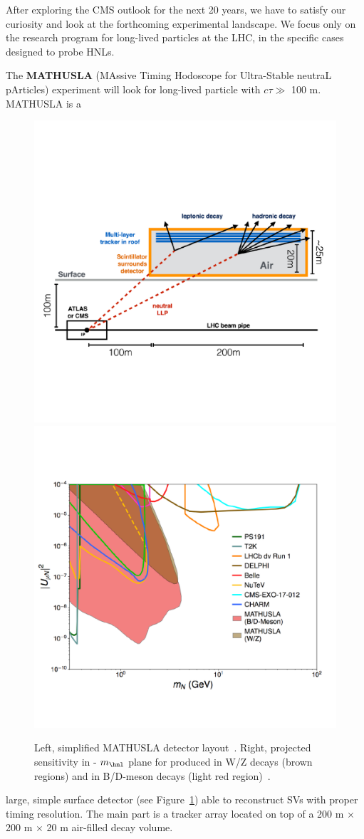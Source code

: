 After exploring the CMS outlook for the next 20 years, we have to satisfy
our curiosity and look at the forthcoming experimental landscape. We
focus only on the research program for long-lived particles at the LHC,
in the specific cases designed to probe HNLs.

The \textbf{MATHUSLA} (MAssive Timing
Hodoscope for Ultra-Stable neutraL pArticles) experiment will look for
long-lived particle with $c\tau \gg$ 100 m. MATHUSLA is a
\begin{figure}[h!]
\centering
    \includegraphics[clip,trim=0.3cm 0cm 1.cm 2cm, width=.45\textwidth]{Figures/c7/mathusla1.pdf}
    \includegraphics[clip,trim=0cm 2cm 0.5cm 3cm, width=.54\textwidth]{Figures/c7/mathusla2.pdf}
\caption{Left, simplified MATHUSLA detector
  layout~\cite{Alimena_2020}. Right, projected sensitivity in \mixparm
  - $m_\hnl$ plane for \hnl produced in W/Z decays (brown regions) and in B/D-meson decays (light red region)~\cite{Curtin_2019}.
}
\label{fig:mathu2}
\end{figure}

large, simple surface detector (see Figure~\ref{fig:mathu2}) able to reconstruct SVs with proper timing
resolution. The main
part is a tracker array located on top of a 200 m $\times$ 200 m
$\times$ 20 m air-filled decay volume.


